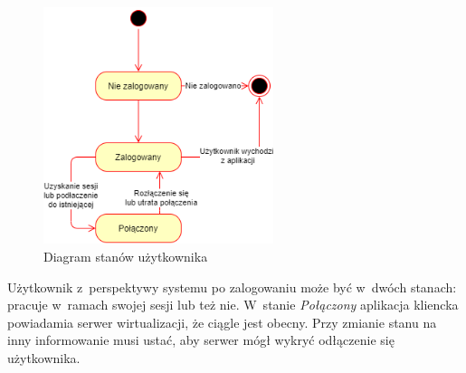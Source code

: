 \documentclass[../opis-rozwiazania.tex]{subfiles}
\begin{document}
\begin{figure}[H]
  \centering
  \includegraphics[width=0.6\textwidth]{../diagrams/state_diagrams/client.png}
  \caption{Diagram stanów użytkownika}
  \label{state_user}
\end{figure}

Użytkownik z~perspektywy systemu po zalogowaniu może być w~dwóch stanach: pracuje w~ramach swojej sesji lub też nie.
W~stanie \textit{Połączony} aplikacja kliencka powiadamia serwer wirtualizacji, że ciągle jest obecny.
Przy zmianie stanu na inny informowanie musi ustać, aby serwer mógł wykryć odłączenie się użytkownika.
\end{document}
